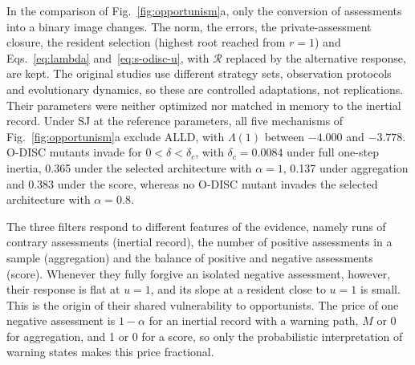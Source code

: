 \documentclass[10pt]{wlscirep}
\newcommand{\Rmap}{\mathscr{R}}            %
\theoremstyle{plain}
\theoremstyle{remark}
\begin{document}
In the comparison of Fig.~\ref{fig:opportunism}a, only the conversion of assessments into a binary image changes. The norm, the errors, the private-assessment closure, the resident selection (highest root reached from $r=1$) and Eqs.~\eqref{eq:lambda} and~\eqref{eq:s-odisc-u}, with $\Rmap$ replaced by the alternative response, are kept. The original studies use different strategy sets, observation protocols and evolutionary dynamics, so these are controlled adaptations, not replications. Their parameters were neither optimized nor matched in memory to the inertial record. Under SJ at the reference parameters, all five mechanisms of Fig.~\ref{fig:opportunism}a exclude ALLD, with $\Lambda(1)$ between $-4.000$ and $-3.778$. O-DISC mutants invade for $0<\delta<\delta_c$, with $\delta_c=0.0084$ under full one-step inertia, 0.365 under the selected architecture with $\alpha=1$, 0.137 under aggregation and 0.383 under the score, whereas no O-DISC mutant invades the selected architecture with $\alpha=0.8$.

The three filters respond to different features of the evidence, namely runs of contrary assessments (inertial record), the number of positive assessments in a sample (aggregation) and the balance of positive and negative assessments (score). Whenever they fully forgive an isolated negative assessment, however, their response is flat at $u=1$, and its slope at a resident close to $u=1$ is small. This is the origin of their shared vulnerability to opportunists. The price of one negative assessment is $1-\alpha$ for an inertial record with a warning path, $M$ or 0 for aggregation, and 1 or 0 for a score, so only the probabilistic interpretation of warning states makes this price fractional.
\end{document}
